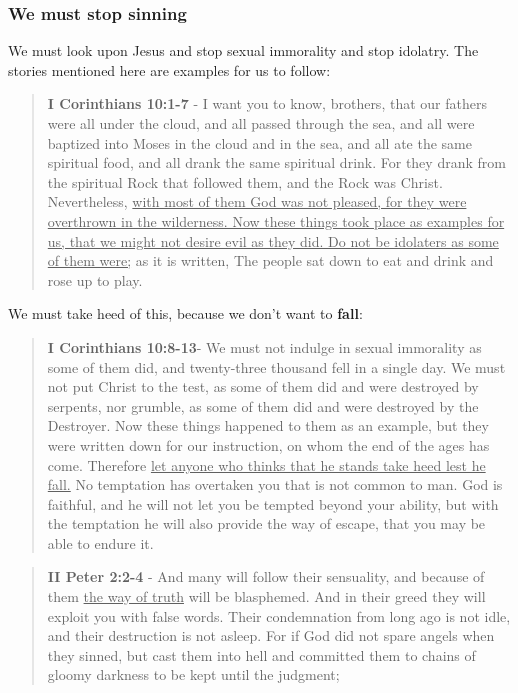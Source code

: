 \documentclass[11pt]{article}
\begin{document}
\subsubsection{We must stop sinning}
\label{sec:org03bf5fb}
We must look upon Jesus and stop sexual immorality and stop idolatry. The stories mentioned here are examples for us to follow:

\begin{quote}
\textbf{I Corinthians 10:1-7} - I want you to know, brothers, that our fathers were all under the cloud, and all passed through the sea, and all were baptized into Moses in the cloud and in the sea, and all ate the same spiritual food, and all drank the same spiritual drink. For they drank from the spiritual Rock that followed them, and the Rock was Christ. Nevertheless, \uline{with most of them God was not pleased, for they were overthrown in the wilderness. Now these things took place as examples for us, that we might not desire evil as they did. Do not be idolaters as some of them were;} as it is written, The people sat down to eat and drink and rose up to play.
\end{quote}

We must take heed of this, because we don't want to \textbf{fall}:

\begin{quote}
\textbf{I Corinthians 10:8-13}- We must not indulge in sexual immorality as some of them did, and twenty-three thousand fell in a single day. We must not put Christ to the test, as some of them did and were destroyed by serpents, nor grumble, as some of them did and were destroyed by the Destroyer. Now these things happened to them as an example, but they were written down for our instruction, on whom the end of the ages has come. Therefore \uline{let anyone who thinks that he stands take heed lest he fall.} No temptation has overtaken you that is not common to man. God is faithful, and he will not let you be tempted beyond your ability, but with the temptation he will also provide the way of escape, that you may be able to endure it.
\end{quote}

\begin{quote}
\textbf{II Peter 2:2-4} - And many will follow their sensuality, and because of them \uline{the way of truth} will be blasphemed. And in their greed they will exploit you with false words. Their condemnation from long ago is not idle, and their destruction is not asleep. For if God did not spare angels when they sinned, but cast them into hell and committed them to chains of gloomy darkness to be kept until the judgment;
\end{quote}
\end{document}
